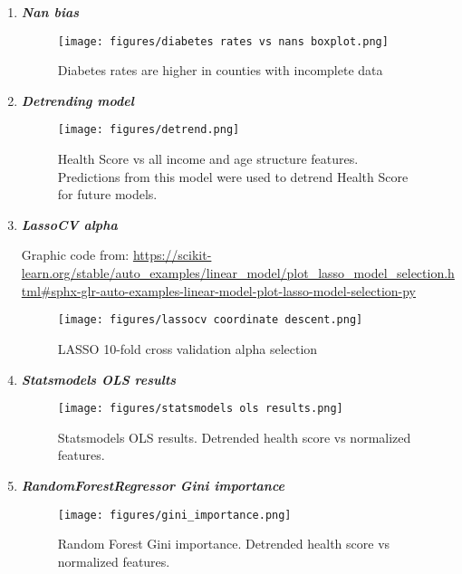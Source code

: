 \documentclass{article}
\begin{document}
\begin{itemize}[leftmargin=0pt]
\begin{enumerate}
    \pagebreak
    \item \textbf{\textit{Nan bias}}
            \label{fig:nan_bias}
        \begin{figure}[h!]
            \centering
            \texttt{[image: figures/diabetes rates vs nans boxplot.png]}
            \caption{Diabetes rates are higher in counties with incomplete data}
        \end{figure}

    \pagebreak
    \item \textbf{\textit{Detrending model}}
            \label{fig:detrend}
        \begin{figure}[h!]
            \centering
            \texttt{[image: figures/detrend.png]}
            \caption{Health Score vs all income and age structure features. Predictions from this model were used to detrend Health Score for future models.}
        \end{figure}

    \pagebreak
    \item \textbf{\textit{LassoCV alpha}}
            \label{fig:lassocv}
    
        Graphic code from: \url{https://scikit-learn.org/stable/auto_examples/linear_model/plot_lasso_model_selection.html#sphx-glr-auto-examples-linear-model-plot-lasso-model-selection-py}
        \begin{figure}[h!]
            \centering
            \texttt{[image: figures/lassocv coordinate descent.png]}
            \caption{LASSO 10-fold cross validation alpha selection}
        \end{figure}

    \pagebreak
    \item \textbf{\textit{Statsmodels OLS results}}
            \label{fig:statsmodelsOLS}
        \begin{figure}[h!]
            \centering
            \texttt{[image: figures/statsmodels ols results.png]}
            \caption{Statsmodels OLS results. Detrended health score vs normalized features.}
        \end{figure}

    \pagebreak
    \item \textbf{\textit{RandomForestRegressor Gini importance}}
             \label{fig:enter-label}
       \begin{figure}[h!]
            \centering
            \texttt{[image: figures/gini\_importance.png]}
            \caption{Random Forest Gini importance. Detrended health score vs normalized features.}
        \end{figure}


\end{enumerate}
\end{itemize}
\end{document}
